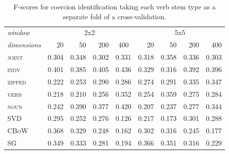\begin{table}
\centering
\begin{tabular}{lrrrr|rrrr}
\hline
\emph{window} & \multicolumn{4}{c}{2x2} & \multicolumn{4}{c}{5x5} \\
\emph{dimensions} & 20 & 50 & 200 & \multicolumn{1}{c}{400} & 20 & 50 & 200 & 400 \\
\hline
\textsc{joint} & 0.304 & 0.348 & 0.302 & 0.331 & 0.318 & 0.358 & 0.336 & 0.303 \\
\textsc{indy} & 0.401 & 0.385 & 0.405 & 0.436 & 0.329 & 0.316 & 0.392 & 0.396 \\
\textsc{zipped} & 0.222 & 0.253 & 0.290 & 0.286 & 0.274 & 0.291 & 0.335 & 0.347 \\
\textsc{verb} & 0.218 & 0.210 & 0.256 & 0.352 & 0.254 & 0.359 & 0.275 & 0.284 \\
\textsc{noun} & 0.242 & 0.390 & 0.377 & 0.420 & 0.207 & 0.237 & 0.277 & 0.344 \\
\textsc{SVD} & 0.295 & 0.252 & 0.276 & 0.126 & 0.217 & 0.173 & 0.301 & 0.288 \\
\textsc{CBoW} & 0.368 & 0.329 & 0.248 & 0.162 & 0.302 & 0.316 & 0.245 & 0.177 \\
\textsc{SG} & 0.349 & 0.333 & 0.281 & 0.194 & 0.366 & 0.351 & 0.316 & 0.229 \\
\hline
\end{tabular}
\caption[F-Scores for Coercion Classification Testing on Unseen Verbs]{F-scores for coercion identification taking each verb stem type as a separate fold of a cross-validation.}
\label{tab:verb-coercion}
\end{table}

